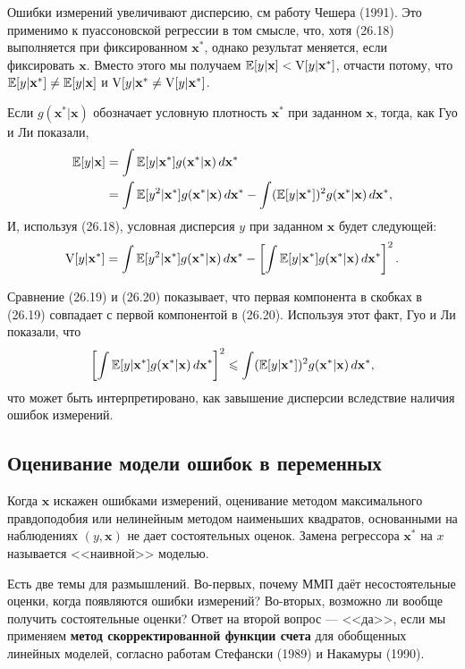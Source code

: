 Ошибки измерений увеличивают дисперсию, см работу Чешера (1991). Это применимо к пуассоновской регрессии в том смысле, что, хотя (26.18) выполняется при фиксированном $\mathbf{x^*}$, однако результат меняется, если фиксировать  $\mathbf{x}$. Вместо этого мы получаем $\mathbb{E}[y| \mathbf{x}]<\mathrm{V}[y| \mathbf{x^*}]$, отчасти потому, что $\mathbb{E}[y| \mathbf{x^*}] \neq \mathbb{E}[y| \mathbf{x}]$  и $\mathrm{V}[y| \mathbf{x^*} \neq \mathrm{V}[y| \mathbf{x^*}]$.

Если $g(\mathbf{x^*|x})$ обозначает условную плотность $\mathbf{x^*}$ при заданном $\mathbf{x}$, тогда, как Гуо и Ли показали, 
\begin{align}
\mathbb{E}[y| \mathbf{x}] &= \int \mathbb{E}[y| \mathbf{x^*}]g(\mathbf{x^*|x})\, d\mathbf{x^*} \notag \\
&= \int \mathbb{E}[y^2| \mathbf{x^*}]g(\mathbf{x^*|x})\, d\mathbf{x^*} - \int (\mathbb{E}[y| \mathbf{x^*}])^2 g(\mathbf{x^*|x})\, d\mathbf{x^*},
\end{align}
И, используя (26.18), условная дисперсия $y$ при заданном $\mathbf{x}$ будет следующей:
\begin{equation}
\mathrm{V}[y| \mathbf{x^*}]= \int \mathbb{E}[y^2| \mathbf{x^*}]g(\mathbf{x^*|x})\, d\mathbf{x^*} -  \left[ \int \mathbb{E}[y| \mathbf{x^*}]g(\mathbf{x^*|x})\, d\mathbf{x^*} \right]^2.
\end{equation}

Сравнение (26.19) и (26.20) показывает, что первая компонента в скобках в (26.19) совпадает с первой компонентой в (26.20). Используя этот факт, Гуо и Ли  показали, что
\begin{equation}
 \left[ \int \mathbb{E}[y| \mathbf{x^*}]g(\mathbf{x^*|x})\, d\mathbf{x^*} \right]^2 \leqslant \int (\mathbb{E}[y| \mathbf{x^*}])^2 g(\mathbf{x^*|x})\, d\mathbf{x^*},
\end{equation}
что может быть интерпретировано, как завышение дисперсии вследствие наличия ошибок измерений.

\subsection*{Оценивание модели ошибок в переменных} 
Когда $\mathbf{x}$ искажен ошибками измерений, оценивание методом максимального правдоподобия или нелинейным методом наименьших квадратов, основанными на наблюдениях $(y, \mathbf{x})$ не  дает состоятельных оценок. Замена  регрессора $\mathbf{x^*}$ на $x$ называется <<наивной>> моделью.

Есть две темы для размышлений. Во-первых, почему ММП даёт несостоятельные оценки, когда появляются ошибки измерений? Во-вторых, возможно ли вообще получить состоятельные оценки? Ответ на второй вопрос –-- <<да>>, если мы применяем {\bf метод скорректированной функции счета} для обобщенных линейных моделей, согласно работам Стефански (1989) и Накамуры (1990). 

